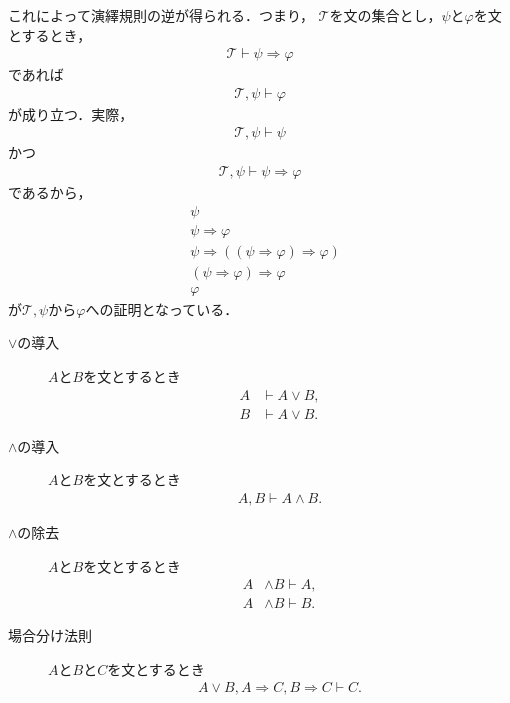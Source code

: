 	これによって演繹規則の逆が得られる．つまり，
	$\mathscr{T}$を文の集合とし，$\psi$と$\varphi$を文とするとき，
	\begin{align}
		\mathscr{T} \vdash \psi \Longrightarrow \varphi
	\end{align}
	であれば
	\begin{align}
		\mathscr{T},\psi \vdash \varphi
	\end{align}
	が成り立つ．実際，
	\begin{align}
		\mathscr{T},\psi \vdash \psi
	\end{align}
	かつ
	\begin{align}
		\mathscr{T},\psi \vdash \psi \Longrightarrow \varphi
	\end{align}
	であるから，
	\begin{align}
		&\psi \\
		&\psi \Longrightarrow \varphi \\
		&\psi \Longrightarrow ((\psi \Longrightarrow \varphi) \Longrightarrow \varphi) \\
		&(\psi \Longrightarrow \varphi) \Longrightarrow \varphi \\
		&\varphi
	\end{align}
	が$\mathscr{T},\psi$から$\varphi$への証明となっている．
	
	\begin{description}
		\item[$\vee$の導入] $A$と$B$を文とするとき
			\begin{align}
				A &\vdash A \vee B, \\
				B &\vdash A \vee B.
			\end{align}
		
		\item[$\wedge$の導入] $A$と$B$を文とするとき
			\begin{align}
				A,B \vdash A \wedge B.
			\end{align}
		
		\item[$\wedge$の除去] $A$と$B$を文とするとき
			\begin{align}
				A &\wedge B \vdash A, \\
				A &\wedge B \vdash B.
			\end{align}
			
		\item[場合分け法則] $A$と$B$と$C$を文とするとき
			\begin{align}
				A \vee B, A \Longrightarrow C, B \Longrightarrow C \vdash C.
			\end{align}
	\end{description}
	
